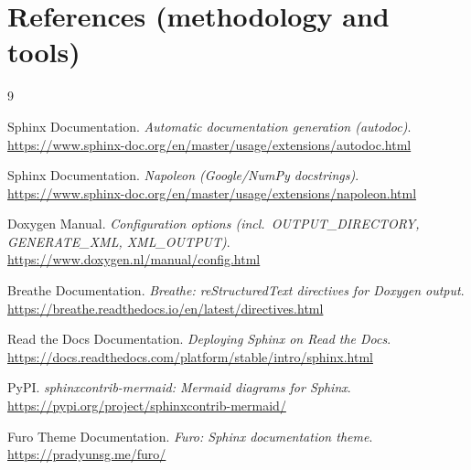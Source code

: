 \documentclass[11pt,a4paper]{article}
\begin{document}
\section*{References (methodology and tools)}
\begin{thebibliography}{9}

Sphinx Documentation. \textit{Automatic documentation generation (autodoc)}.\\
\url{https://www.sphinx-doc.org/en/master/usage/extensions/autodoc.html}

Sphinx Documentation. \textit{Napoleon (Google/NumPy docstrings)}.\\
\url{https://www.sphinx-doc.org/en/master/usage/extensions/napoleon.html}

Doxygen Manual. \textit{Configuration options (incl.\ OUTPUT\_DIRECTORY, GENERATE\_XML, XML\_OUTPUT)}.\\
\url{https://www.doxygen.nl/manual/config.html}

Breathe Documentation. \textit{Breathe: reStructuredText directives for Doxygen output}.\\
\url{https://breathe.readthedocs.io/en/latest/directives.html}

Read the Docs Documentation. \textit{Deploying Sphinx on Read the Docs}.\\
\url{https://docs.readthedocs.com/platform/stable/intro/sphinx.html}

PyPI. \textit{sphinxcontrib-mermaid: Mermaid diagrams for Sphinx}.\\
\url{https://pypi.org/project/sphinxcontrib-mermaid/}

Furo Theme Documentation. \textit{Furo: Sphinx documentation theme}.\\
\url{https://pradyunsg.me/furo/}

\end{thebibliography}
\end{document}
